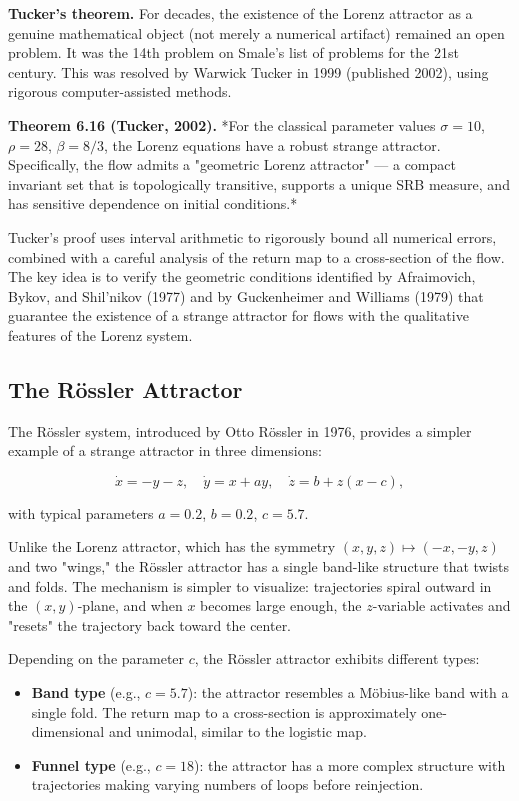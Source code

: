 \textbf{Tucker's theorem.} For decades, the existence of the Lorenz attractor as a genuine mathematical object (not merely a numerical artifact) remained an open problem. It was the 14th problem on Smale's list of problems for the 21st century. This was resolved by Warwick Tucker in 1999 (published 2002), using rigorous computer-assisted methods.

\textbf{Theorem 6.16 (Tucker, 2002).} *For the classical parameter values $\sigma = 10$, $\rho = 28$, $\beta = 8/3$, the Lorenz equations have a robust strange attractor. Specifically, the flow admits a "geometric Lorenz attractor" --- a compact invariant set that is topologically transitive, supports a unique SRB measure, and has sensitive dependence on initial conditions.*

Tucker's proof uses interval arithmetic to rigorously bound all numerical errors, combined with a careful analysis of the return map to a cross-section of the flow. The key idea is to verify the geometric conditions identified by Afraimovich, Bykov, and Shil'nikov (1977) and by Guckenheimer and Williams (1979) that guarantee the existence of a strange attractor for flows with the qualitative features of the Lorenz system.

\subsection{The Rössler Attractor}\label{sec:6.4.4}

The Rössler system, introduced by Otto Rössler in 1976, provides a simpler example of a strange attractor in three dimensions:

\[
\dot{x} = -y - z, \quad \dot{y} = x + ay, \quad \dot{z} = b + z(x - c),
\]

with typical parameters $a = 0.2$, $b = 0.2$, $c = 5.7$.

Unlike the Lorenz attractor, which has the symmetry $(x,y,z) \mapsto (-x,-y,z)$ and two "wings," the Rössler attractor has a single band-like structure that twists and folds. The mechanism is simpler to visualize: trajectories spiral outward in the $(x,y)$-plane, and when $x$ becomes large enough, the $z$-variable activates and "resets" the trajectory back toward the center.

Depending on the parameter $c$, the Rössler attractor exhibits different types:

\begin{itemize}[nosep]
  \item \textbf{Band type} (e.g., $c = 5.7$): the attractor resembles a Möbius-like band with a single fold. The return map to a cross-section is approximately one-dimensional and unimodal, similar to the logistic map.
  \item \textbf{Funnel type} (e.g., $c = 18$): the attractor has a more complex structure with trajectories making varying numbers of loops before reinjection.
\end{itemize}

